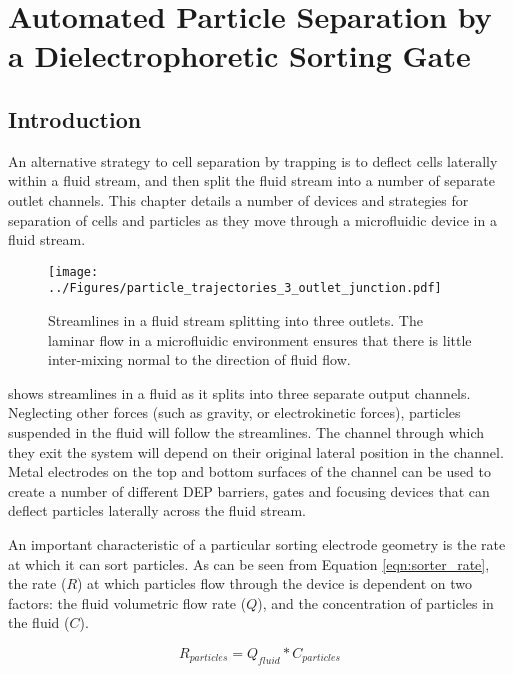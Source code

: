 \chapter{Automated Particle Separation by a Dielectrophoretic Sorting Gate} 
\label{Chapter:SorterDevice}

\section{Introduction}
An alternative strategy to cell separation by trapping is to deflect cells laterally within a fluid stream, and then split the fluid stream into a number of separate outlet channels. This chapter details a number of devices and strategies for separation of cells and particles as they move through a microfluidic device in a fluid stream.

\begin{figure}
 \centering
 \texttt{[image: ../Figures/particle\_trajectories\_3\_outlet\_junction.pdf]}
 \caption[Streamlines in a fluid stream splitting into three outlets.]{Streamlines in a fluid stream splitting into three outlets. The laminar flow in a microfluidic environment ensures that there is little inter-mixing normal to the direction of fluid flow.}
 \label{fig:particle_trajectories_3_outlet_junction}
\end{figure}

 shows streamlines in a fluid as it splits into three separate output channels. Neglecting other forces (such as gravity, or electrokinetic forces), particles suspended in the fluid will follow the streamlines. The channel through which they exit the system will depend on their original lateral position in the channel. Metal electrodes on the top and bottom surfaces of the channel can be used to create a number of different DEP barriers, gates and focusing devices that can deflect particles laterally across the fluid stream.

An important characteristic of a particular sorting electrode geometry is the rate at which it can sort particles. As can be seen from Equation \ref{eqn:sorter_rate}, the rate ($R$) at which particles flow through the device is dependent on two factors: the fluid volumetric flow rate ($Q$), and the concentration of particles in the fluid ($C$). 

\begin{equation}
 R_{particles} = Q_{fluid} * C_{particles}
\label{eqn:sorter_rate}
\end{equation}

